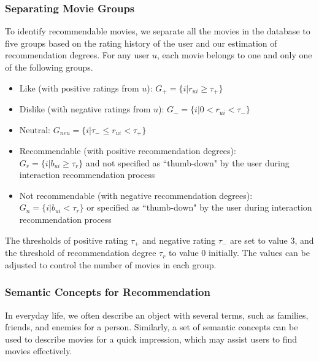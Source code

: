 \documentclass{vgtc}                          %
\begin{document}
\subsubsection{Separating Movie Groups}

To identify recommendable movies, we separate all the movies in the database to five groups based on the rating history of the user and our estimation of recommendation degrees.
For any user $u$, each movie belongs to one and only one of the following groups.

\begin{itemize}
\vspace{-2mm}
\item Like (with positive ratings from $u$): $G_+ = \{i | {r_{ui}} \geq \tau_{+}\}$
\vspace{-2mm}
\item Dislike (with negative ratings from $u$): $G_- = \{i | 0 < {r_{ui}} < \tau_{-}\}$
\vspace{-2mm}
\item Neutral: $G_{neu} = \{i | \tau_{-} \leq r_{ui} <\tau_{+}\}$
\vspace{-2mm}
\item Recommendable (with positive recommendation degrees):\\ $G_r = \{i | b_{ui} \geq \tau_{r}\}$ and not specified as ``thumb-down" by the user during interaction recommendation process
\vspace{-2mm}
\item Not recommendable (with negative recommendation degrees): $G_n = \{i | b_{ui} < \tau_{r}\}$ or specified as ``thumb-down" by the user during interaction recommendation process
\end{itemize}

The thresholds of positive rating $\tau_{+}$ and negative rating $\tau_{-}$ are set to value $3$, and the threshold of recommendation degree $\tau_{r}$ to value $0$ initially.
The values can be adjusted to control the number of movies in each group.


\subsubsection{Semantic Concepts for Recommendation}

In everyday life, we often describe an object with several terms, such as families, friends, and enemies for a person.
Similarly, a set of semantic concepts can be used to describe movies for a quick impression, which may assist users to find movies effectively.
\end{document}
